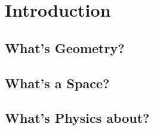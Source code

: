 \chapter{Introduction}
\section{What's Geometry?}

\section{What's a Space?}

\section{What's Physics about?}

